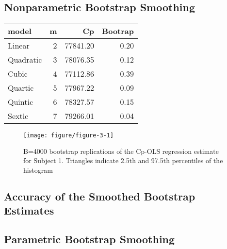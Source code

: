 \documentclass[11pt,letter]{article}\usepackage[]{graphicx}\usepackage[]{color}
\makeatletter
\def\maxwidth{ %
  \ifdim\Gin@nat@width>\linewidth
    \linewidth
  \else
    \Gin@nat@width
  \fi
}
\newenvironment{knitrout}{}{} %
\makeatother
\begin{document}
\subsection{Nonparametric Bootstrap Smoothing}









\begin{table}[ht]
\centering
\begin{tabular}{lrrr}
  \hline
model & m & Cp & Bootrap \\ 
  \hline
Linear &   2 & 77841.20 & 0.20 \\ 
  Quadratic &   3 & 78076.35 & 0.12 \\ 
  Cubic &   4 & 77112.86 & 0.39 \\ 
  Quartic &   5 & 77967.22 & 0.09 \\ 
  Quintic &   6 & 78327.57 & 0.15 \\ 
  Sextic &   7 & 79266.01 & 0.04 \\ 
   \hline
\end{tabular}
\end{table}


\begin{knitrout}
\color{fgcolor}\begin{figure}

{\centering \texttt{[image: figure/figure-3-1]} 

}

\caption[B=4000 bootstrap replications of the Cp-OLS regression estimate for Subject 1]{B=4000 bootstrap replications of the Cp-OLS regression estimate for Subject 1. Triangles indicate 2.5th and 97.5th percentiles of the histogram}\label{fig:figure-3}
\end{figure}


\end{knitrout}



\subsection{Accuracy of the Smoothed Bootstrap Estimates}



\subsection{Parametric Bootstrap Smoothing}
\end{document}
